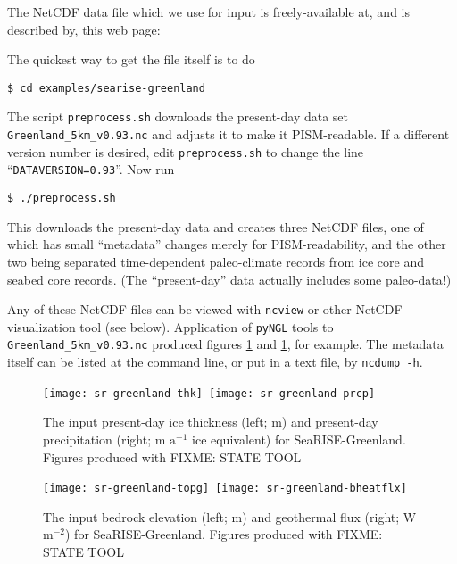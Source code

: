 The NetCDF data file which we use for input is freely-available at, and is described by, this web page: 
\medskip

\centerline{}
\medskip

\noindent The quickest way to get the file itself is to do

\verb|$ cd examples/searise-greenland|

\noindent The script \verb|preprocess.sh| downloads the present-day data set  \verb|Greenland_5km_v0.93.nc| and adjusts it to make it PISM-readable.  If a different version number is desired, edit \verb|preprocess.sh| to change the line ``\verb|DATAVERSION=0.93|''.  Now run

\verb|$ ./preprocess.sh|

\noindent This downloads the present-day data and creates three NetCDF files, one of which has small ``metadata'' changes merely for PISM-readability, and the other two being separated time-dependent paleo-climate records from ice core and seabed core records.  (The ``present-day'' data actually includes some paleo-data!)

Any of these NetCDF files can be viewed with \verb|ncview| or other NetCDF visualization tool (see below).  Application of \verb|pyNGL| tools to \verb|Greenland_5km_v0.93.nc| produced figures \ref{fig:sr-input1} and  \ref{fig:sr-input1}, for example.  The metadata itself can be listed at the command line, or put in a text file, by \verb|ncdump -h|.

\begin{figure}[ht]
\mbox{\texttt{[image: sr-greenland-thk]}
 \quad\texttt{[image: sr-greenland-prcp]}}
\caption{The input present-day ice thickness (left; m) and present-day precipitation (right; m $\text{a}^{-1}$ ice equivalent) for SeaRISE-Greenland.  Figures produced with FIXME: STATE TOOL}
\label{fig:sr-input1}
\end{figure}

\begin{figure}[ht]
\mbox{\texttt{[image: sr-greenland-topg]}
 \quad \texttt{[image: sr-greenland-bheatflx]}}
\caption{The input bedrock elevation (left; m) and geothermal flux (right; W $\text{m}^{-2}$) for SeaRISE-Greenland.  Figures produced with FIXME: STATE TOOL}
\label{fig:sr-input2}
\end{figure}


